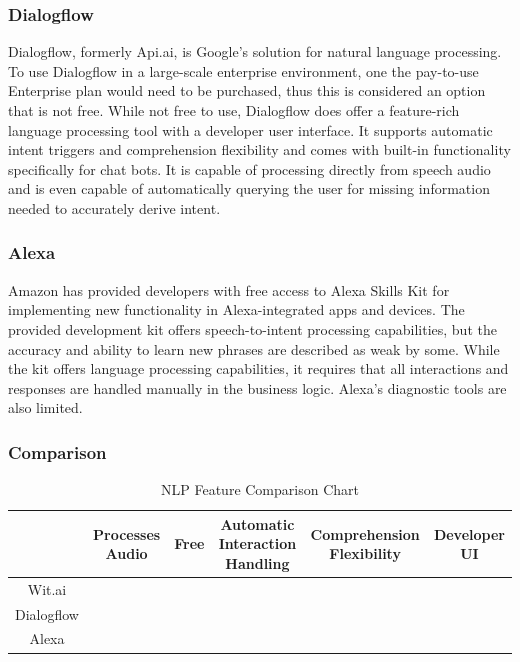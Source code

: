 \documentclass[onecolumn, draftclsnofoot,10pt, compsoc]{IEEEtran}
\newcommand{\greencheck}{\textcolor{ForestGreen}{\ding{51}}}%
\newcommand{\redcheck}{\textcolor{red}{\ding{51}}}%
\begin{document}
	\subsubsection{Dialogflow}
	Dialogflow, formerly Api.ai, is Google's solution for natural language processing.
	To use Dialogflow in a large-scale enterprise environment, one the pay-to-use Enterprise plan would need to be purchased\cite{DialogflowPricing}, thus this is considered an option that is not free.
	While not free to use, Dialogflow does offer a feature-rich language processing tool with a developer user interface.
	It supports automatic intent triggers and comprehension flexibility and comes with built-in functionality specifically for chat bots.
	It is capable of processing directly from speech audio and is even capable of automatically querying the user for missing information needed to accurately derive intent\cite{NLPComparisons}.
	\subsubsection{Alexa}
	Amazon has provided developers with free access to Alexa Skills Kit for implementing new functionality in Alexa-integrated apps and devices.
	The provided development kit offers speech-to-intent processing capabilities, but the accuracy and ability to learn new phrases are described as weak by some.
	While the kit offers language processing capabilities, it requires that all interactions and responses are handled manually in the business logic.
	Alexa's diagnostic tools are also limited\cite{NLPComparisons}.

	\subsubsection{Comparison}
	\begin{table}[H]
		\begin{center}
			\begin{tabular}{|c|c|c|c|c|c|}
				\hline
				& Processes Audio & Free & Automatic Interaction Handling & Comprehension Flexibility & Developer UI \\
				\hline
				Wit.ai & \greencheck & \greencheck & \greencheck &  \greencheck & \greencheck \\
				\hline
				Dialogflow & \greencheck & \redcheck & \greencheck & \greencheck & \greencheck \\
				\hline
				Alexa & \greencheck & \greencheck & \redcheck &  \redcheck &  \redcheck \\
				\hline
			\end{tabular}
			\caption{NLP Feature Comparison Chart}\label{tab:NLPFeatCompare}
		\end{center}
	\end{table}
\end{document}
